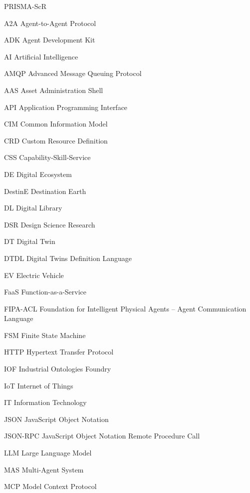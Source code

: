 
\begin{listofabbrv}{PRISMA-ScR}
    \item[A2A]       Agent-to-Agent Protocol
    \item[ADK]       Agent Development Kit
    \item[AI]        Artificial Intelligence
    \item[AMQP]      Advanced Message Queuing Protocol
    \item[AAS]       Asset Administration Shell
    \item[API]       Application Programming Interface
    \item[CIM]       Common Information Model
    \item[CRD]       Custom Resource Definition
    \item[CSS]       Capability-Skill-Service
    \item[DE]        Digital Ecosystem
    \item[DestinE]   Destination Earth
    \item[DL]        Digital Library
    \item[DSR]       Design Science Research
    \item[DT]        Digital Twin
    \item[DTDL]      Digital Twins Definition Language
    \item[EV]        Electric Vehicle
    \item[FaaS]      Function-as-a-Service
    \item[FIPA-ACL]  Foundation for Intelligent Physical Agents -- Agent Communication Language
    \item[FSM]       Finite State Machine
    \item[HTTP]      Hypertext Transfer Protocol
    \item[IOF]       Industrial Ontologies Foundry
    \item[IoT]       Internet of Things
    \item[IT]        Information Technology
    \item[JSON]      JavaScript Object Notation
    \item[JSON-RPC]  JavaScript Object Notation Remote Procedure Call
    \item[LLM]       Large Language Model
    \item[MAS]       Multi-Agent System
    \item[MCP]       Model Context Protocol

\end{listofabbrv}
